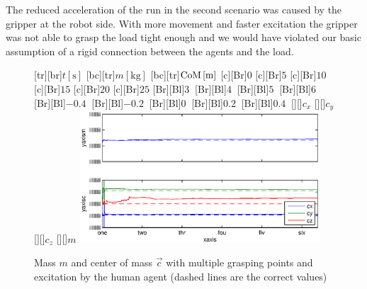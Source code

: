The reduced acceleration of the run in the second scenario was caused by the gripper at the robot side. With more movement and faster excitation the gripper was not able to grasp the load tight enough and we would have violated our basic assumption of a rigid connection between the agents and the load.

\begin{figure}
	\centering	
	[tr][br]{$t\left[\mathrm{s}\right]$}
	[bc][tr]{$m\left[\mathrm{kg}\right]$}
	[bc][tr]{$\mathrm{CoM}\left[\mathrm{m}\right]$}
	[Br]{$0$}
	[Br]{$5$}
	[Br]{$10$}
	[Br]{$15$}
	[Br]{$20$}
	[Br]{$25$}
	[Br][Bl]{$3\  $}
	[Br][Bl]{$4\ $}
	[Br][Bl]{$5\  $}
	[Br][Bl]{$6\  $}
	[Br][Bl]{$-0.4\  $}
	[Br][Bl]{$-0.2\ $}
	[Br][Bl]{$0\  $}
	[Br][Bl]{$0.2\  $}
	[Br][Bl]{$0.4\  $}
	[][]{\tiny $c_x$}
	[][]{\tiny $c_y$}
	[][]{\tiny $c_z$}
	[][]{\tiny $m$}
	\includegraphics[width=0.8\textwidth]{figures/multiple_grasping_points_human_mass_and_cog.eps}
	\vspace{0.2cm}
	\caption[Mass error, multiple grasping points, excitation by human agent]{Mass $m$ and center of mass $\vec{c}$ with multiple grasping points and excitation by the human agent (dashed lines are the correct values)}
	\label{fig:estim_mass_multi_human}
\end{figure}

